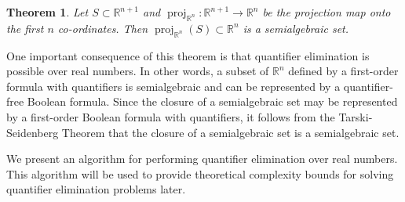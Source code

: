 \documentclass[
]{book}
\newtheorem{theorem}{Theorem}[chapter]
\theoremstyle{definition}
\theoremstyle{definition}
\theoremstyle{definition}
\theoremstyle{definition}
\theoremstyle{remark}
\begin{document}
\begin{theorem}
\protect\hypertarget{thm:tarski-seinedberg}{}\label{thm:tarski-seinedberg}\citep{vdd1988tarski}
Let \(S \subset \mathbb{R}^{n+1}\) and \({\operatorname{proj}_{\mathbb{R}^{n}}} : \mathbb{R}^{n+1} \to \mathbb{R}^n\) be the projection map onto the first \(n\) co-ordinates. Then \({\operatorname{proj}_{\mathbb{R}^{n}}}(S) \subset \mathbb{R}^n\) is a semialgebraic set.
\end{theorem}

One important consequence of this theorem is that quantifier elimination is possible over real numbers. In other words, a subset of \(\mathbb{R}^n\) defined by a first-order formula with quantifiers is semialgebraic and can be represented by a quantifier-free Boolean formula.
Since the closure of a semialgebraic set may be represented by a first-order Boolean formula with quantifiers, it follows from the Tarski-Seidenberg Theorem that the closure of a semialgebraic set is a semialgebraic set.

We present an algorithm for performing quantifier elimination over real numbers. This algorithm will be used to provide theoretical complexity bounds for solving quantifier elimination problems later.
\end{document}
